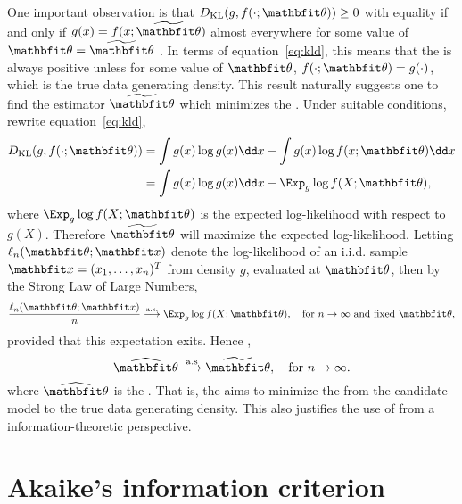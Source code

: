 One important observation is that $\dkl(g,f(\cdot;\bth))\ge0$ with equality if
and only if $g(x) = f(x;\tbth)$ almost everywhere for some value of $\bth =
\tbth$ \parencite{Kullback:1951va}. In terms of equation~\eqref{eq:kld}, this
means that the \kl is always positive unless for some value of $\bth$,
$f(\cdot;\bth) = g(\cdot)$, which is the true data generating density. This
result naturally suggests one to find the estimator $\tbth$ which minimizes
the \kl. Under suitable conditions, rewrite equation~\eqref{eq:kld},
\begin{align}
  \dkl(g,f(\cdot;\bth))
  & = \int g(x)\log g(x)\dd x - \int g(x)\log f(x;\bth)\dd x \notag\\
  & = \int g(x)\log g(x)\dd x - \Exp_g \log f(X;\bth),
  \label{eq:kl exp ll}
\end{align}
where $\Exp_g\log f(X;\bth)$ is the expected log-likelihood with respect to
$g(X)$. Therefore $\tbth$ will maximize the expected log-likelihood. Letting
$\ell_n(\bth;\bfx)$ denote the log-likelihood of an i.i.d. sample $\bfx =
(x_1,\dots,x_n)^T$ from density $g$, evaluated at $\bth$, then by the Strong
Law of Large Numbers,
\begin{equation}
  \frac{\ell_n(\bth;\bfx)}{n}
  \overset{\mathrm{a.s.}}{\longrightarrow}
  \Exp_g\log f(X;\bth), \quad\text{for } n\to\infty\text{ and fixed }\bth,
  \label{eq:kl consistency}
\end{equation}
provided that this expectation exits. Hence \parencite[see][for
details]{Kullback:1951va},
\begin{equation}
  \hbth \overset{\mathrm{a.s}}{\longrightarrow} \tbth,
  \quad\text{for } n\to\infty.
\end{equation}
where $\hbth$ is the \mle. That is, the \mle aims to minimize the \kl from the
candidate model to the true data generating density. This also justifies the
use of \mle from a information-theoretic perspective.

\section{Akaike's information criterion}
\label{sec:Akaike's information criterion}

